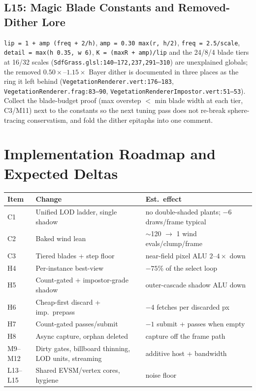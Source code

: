\documentclass[11pt,a4paper]{article}
\begin{document}
\subsection{L15: Magic Blade Constants and Removed-Dither Lore}

\texttt{lip = 1 + amp\,(freq + 2/h)}, \texttt{amp = 0.30\,max(r, h/2)},
\texttt{freq = 2.5/scale}, \texttt{detail = max(h\,0.35, w\,6)},
\texttt{K = (maxR + amp)/lip} and the 24/8/4 blade tiers at 16/32 scales
(\texttt{SdfGrass.glsl:140--172,237,291--310}) are unexplained globals; the
removed $0.50\times$--$1.15\times$ Bayer dither is documented in three
places as the ring it left behind (\texttt{VegetationRenderer.vert:176--183},
\texttt{VegetationRenderer.frag:83--90},
\texttt{VegetationRendererImpostor.vert:51--53}). Collect the blade-budget
proof (max overstep $<$ min blade width at each tier, C3/M11) next to the
constants so the next tuning pass does not re-break sphere-tracing
conservatism, and fold the dither epitaphs into one comment.

\section{Implementation Roadmap and Expected Deltas}

\begin{table}[h]
\centering
\small
\begin{tabular}{@{}lp{5.8cm}p{5.6cm}@{}}
\toprule
\textbf{Item} & \textbf{Change} & \textbf{Est.\ effect} \\
\midrule
C1 & Unified LOD ladder, single shadow & no double-shaded plants; $-6$ draws/frame typical \\
C2 & Baked wind lean & $\sim$120 $\rightarrow$ 1 wind evals/clump/frame \\
C3 & Tiered blades + step floor & near-field pixel ALU $2$--$4\times$ down \\
H4 & Per-instance best-view & $-75$\% of the select loop \\
H5 & Count-gated + impostor-grade shadow & outer-cascade shadow ALU down \\
H6 & Cheap-first discard + imp.\ prepass & $-$4 fetches per discarded px \\
H7 & Count-gated passes/submit & $-1$ submit + passes when empty \\
H8 & Async capture, orphan deleted & capture off the frame path \\
M9--M12 & Dirty gates, billboard thinning, LOD units, streaming & additive host + bandwidth \\
L13--L15 & Shared EVSM/vertex cores, hygiene & noise floor \\
\bottomrule
\end{tabular}
\end{table}
\end{document}
